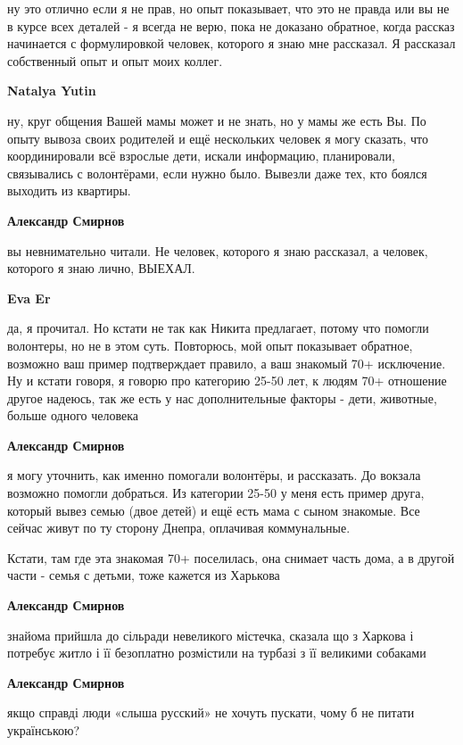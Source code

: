 \begin{itemize}
\begin{itemize}
ну это отлично если я не прав, но опыт показывает, что это не правда или вы не
в курсе всех деталей - я всегда не верю, пока не доказано обратное, когда
рассказ начинается с формулировкой человек, которого я знаю мне рассказал. Я
рассказал собственный опыт и опыт моих коллег.

\textbf{Natalya Yutin} 

ну, круг общения Вашей мамы может и не знать, но у мамы же есть Вы. По опыту
вывоза своих родителей и ещё нескольких человек я могу сказать, что
координировали всё взрослые дети, искали информацию, планировали, связывались с
волонтёрами, если нужно было. Вывезли даже тех, кто боялся выходить из
квартиры.

\textbf{Александр Смирнов} 

вы невнимательно читали. Не человек, которого я знаю рассказал, а человек,
которого я знаю лично, ВЫЕХАЛ.

\textbf{Eva Er} 

да, я прочитал. Но кстати не так как Никита предлагает, потому что помогли
волонтеры, но не в этом суть. Повторюсь, мой опыт показывает обратное, возможно
ваш пример подтверждает правило, а ваш знакомый 70+ исключение. Ну и кстати
говоря, я говорю про категорию 25-50 лет, к людям 70+ отношение другое надеюсь,
так же есть у нас дополнительные факторы - дети, животные, больше одного
человека

\textbf{Александр Смирнов} 

я могу уточнить, как именно помогали волонтёры, и рассказать. До вокзала
возможно помогли добраться. Из категории 25-50 у меня есть пример друга,
который вывез семью (двое детей) и ещё есть мама с сыном знакомые. Все сейчас
живут по ту сторону Днепра, оплачивая коммунальные.


Кстати, там где эта знакомая 70+ поселилась, она снимает часть дома, а в другой
части - семья с детьми, тоже кажется из Харькова

\textbf{Александр Смирнов} 

знайома прийшла до сільради невеликого містечка, сказала що з Харкова і
потребує житло і її безоплатно розмістили на турбазі з її великими собаками

\textbf{Александр Смирнов} 

якщо справді люди «слыша русский» не хочуть пускати, чому б не питати
українською?


\end{itemize}
\end{itemize}
